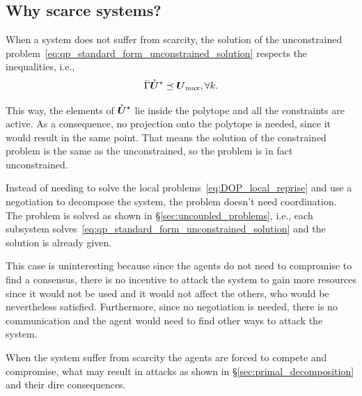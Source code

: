 \documentclass[../main.tex]{subfiles}
\begin{document}
\subsection{Why scarce systems?}\label{sec:why-scarce-systems}

When a system does not suffer from scarcity, the solution of the unconstrained problem~\eqref{eq:qp_standard_form_unconstrained_solution} respects the inequalities, i.e.,
\begin{equation}
\bar{\Gamma}{\mathring{\boldsymbol{U}}^{\star}}\preceq {\boldsymbol{U}}_{\text{max}},\forall k.
\end{equation}

This way, the elements of ${\mathring{\boldsymbol{U}}^{\star}}$ lie inside the polytope and all the constraints are active.
As a consequence, no projection onto the polytope is needed, since it would result in the same point.
That means the solution of the constrained problem is the same as the unconstrained, so the problem is in fact unconstrained.

Instead of needing to solve the local problems~\eqref{eq:DOP_local_reprise} and use a negotiation to decompose the system, the problem doesn't need coordination.
The problem is solved as shown in \S\ref{sec:uncoupled_problems}, i.e., each subsystem solves~\eqref{eq:qp_standard_form_unconstrained_solution} and the solution is already given.

This case is uninteresting because since the agents do not need to compromise to find a consensus, there is no incentive to attack the system to gain more resources since it would not be used and it would not affect the others, who would be nevertheless satisfied.
Furthermore, since no negotiation is needed, there is no communication and the agent would need to find other ways to attack the system.

When the system suffer from scarcity the agents are forced to compete and compromise, what may result in attacks as shown in \S\ref{sec:primal_decomposition} and their dire consequences.
\end{document}
